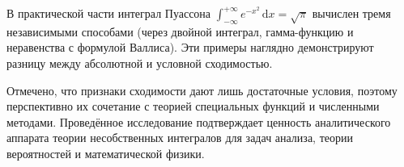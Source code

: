 \documentclass[coursework, och, times]{SCWorks1}
\newcommand{\dd}{\,\mathrm{d}}
\begin{document}
В практической части интеграл Пуассона \(\int_{-\infty}^{+\infty}e^{-x^2}\dd x=\sqrt{\pi}\) вычислен тремя независимыми способами (через двойной интеграл, гамма-функцию и неравенства с формулой Валлиса). Эти примеры наглядно демонстрируют разницу между абсолютной и условной сходимостью.

Отмечено, что признаки сходимости дают лишь достаточные условия, поэтому перспективно их сочетание с теорией специальных функций и численными методами. Проведённое исследование подтверждает ценность аналитического аппарата теории несобственных интегралов для задач анализа, теории вероятностей и математической физики.




\end{document}
